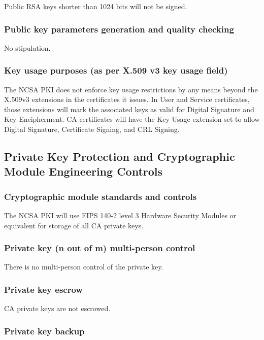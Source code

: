 \documentclass[10pt]{article}
\begin{document}
Public RSA keys shorter than 1024 bits will not be signed.

\subsubsection{Public key parameters generation and quality checking}

No stipulation.

\subsubsection{Key usage purposes (as per X.509 v3 key usage field)}

The NCSA PKI does not enforce key usage restrictions by any means
beyond the X.509v3 extensions in the certificates it issues. In User
and Service certificates, those extensions will mark the associated
keys as valid for Digital Signature and Key Encipherment. CA
certificates will have the Key Usage extension set to allow Digital
Signature, Certificate Signing, and CRL Signing.

\subsection{Private Key Protection and Cryptographic Module Engineering Controls}
\subsubsection{Cryptographic module standards and controls}

The NCSA PKI will use FIPS 140-2 level 3 Hardware Security Modules or
equivalent for storage of all CA private keys.

\subsubsection{Private key (n out of m) multi-person control}

There is no multi-person control of the private key.

\subsubsection{Private key escrow}

CA private keys are not escrowed.

\subsubsection{Private key backup}
\end{document}

